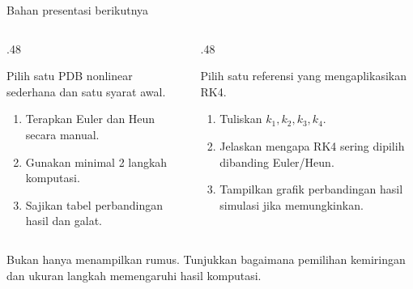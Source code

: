 \documentclass[aspectratio=169,10pt]{beamer}
\begin{document}
\begin{frame}{Bahan presentasi berikutnya}
\scriptsize
\begin{columns}[T,totalwidth=\textwidth]
\begin{column}{.48\textwidth}
\begin{bluebox}
Pilih satu PDB nonlinear sederhana dan satu syarat awal.
\begin{enumerate}
\item Terapkan Euler dan Heun secara manual.
\item Gunakan minimal 2 langkah komputasi.
\item Sajikan tabel perbandingan hasil dan galat.
\end{enumerate}
\end{bluebox}
\end{column}
\begin{column}{.48\textwidth}
\begin{purplebox}
Pilih satu referensi yang mengaplikasikan RK4.
\begin{enumerate}
\item Tuliskan $k_1,k_2,k_3,k_4$.
\item Jelaskan mengapa RK4 sering dipilih dibanding Euler/Heun.
\item Tampilkan grafik perbandingan hasil simulasi jika memungkinkan.
\end{enumerate}
\end{purplebox}
\end{column}
\end{columns}
\vspace{1mm}
\begin{goldbox}
Bukan hanya menampilkan rumus. Tunjukkan bagaimana pemilihan kemiringan dan ukuran langkah memengaruhi hasil komputasi.
\end{goldbox}
\end{frame}
\end{document}
